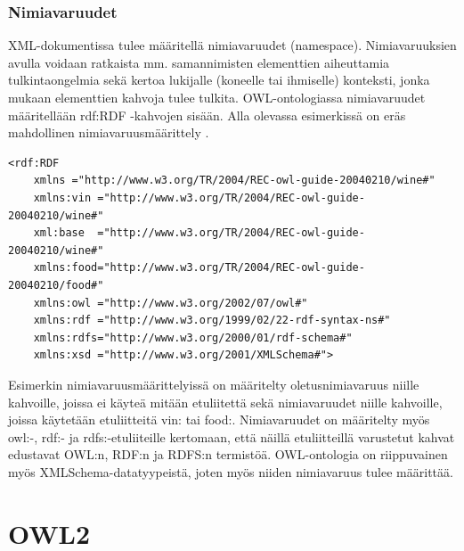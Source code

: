 \documentclass[finnish]{tktltiki2}
\theoremstyle{definition}
\theoremstyle{remark}
\begin{document}
\subsubsection{Nimiavaruudet}
XML-dokumentissa tulee määritellä nimiavaruudet (namespace). Nimiavaruuksien
avulla voidaan ratkaista mm. samannimisten elementtien aiheuttamia
tulkintaongelmia sekä kertoa lukijalle (koneelle tai ihmiselle) konteksti, jonka
mukaan elementtien kahvoja tulee tulkita. OWL-ontologiassa nimiavaruudet
määritellään rdf:RDF -kahvojen sisään. Alla olevassa esimerkissä on eräs
mahdollinen nimiavaruusmäärittely \cite{BHL01}. 
\begin{verbatim}
<rdf:RDF 
    xmlns ="http://www.w3.org/TR/2004/REC-owl-guide-20040210/wine#" 
    xmlns:vin ="http://www.w3.org/TR/2004/REC-owl-guide-20040210/wine#"       
    xml:base  ="http://www.w3.org/TR/2004/REC-owl-guide-20040210/wine#"       
    xmlns:food="http://www.w3.org/TR/2004/REC-owl-guide-20040210/food#"    
    xmlns:owl ="http://www.w3.org/2002/07/owl#"
    xmlns:rdf ="http://www.w3.org/1999/02/22-rdf-syntax-ns#"
    xmlns:rdfs="http://www.w3.org/2000/01/rdf-schema#"
    xmlns:xsd ="http://www.w3.org/2001/XMLSchema#">
\end{verbatim}
Esimerkin nimiavaruusmäärittelyissä on määritelty oletusnimiavaruus niille
kahvoille, joissa ei käyteä mitään etuliitettä sekä nimiavaruudet niille
kahvoille, joissa käytetään etuliitteitä vin: tai food:. Nimiavaruudet on
määritelty myös owl:-, rdf:- ja rdfs:-etuliiteille kertomaan, että näillä
etuliitteillä varustetut kahvat edustavat OWL:n, RDF:n ja RDFS:n termistöä.
OWL-ontologia on riippuvainen myös XMLSchema-datatyypeistä, joten myös niiden
nimiavaruus tulee määrittää. 
\section{OWL2}



%
%
% 
%



\end{document}
